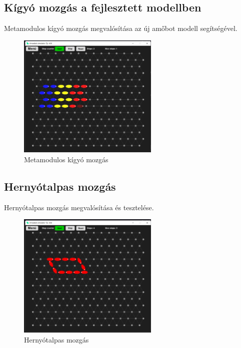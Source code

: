 \documentclass[	
  noindent
]{elteikthesis}[2024/04/26]
\begin{document}
      \subsection{Kígyó mozgás a fejlesztett modellben}
        Metamodulos kígyó mozgás megvalósítása az új amőbot modell segítségével.
      \begin{figure}[H]
      \centering
      \includegraphics[width=0.6\textwidth]{images/simulatons/08_snake.png}
      \caption{Metamodulos kígyó mozgás}
      \label{fig:08_snake}
      \end{figure}

      \subsection{Hernyótalpas mozgás}
        Hernyótalpas mozgás megvalósítása és tesztelése.
      \begin{figure}[H]
      \centering
      \includegraphics[width=0.6\textwidth]{images/simulatons/09_crawler.png}
      \caption{Hernyótalpas mozgás}
      \label{fig:09_crawler}
      \end{figure}
\end{document}
